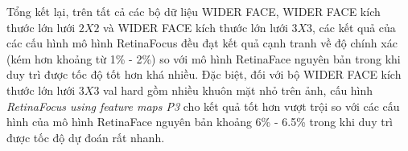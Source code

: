 {    \noindent
    Tổng kết lại, trên tất cả các bộ dữ liệu WIDER FACE, WIDER FACE kích thước lớn lưới $2 X 2$ và WIDER FACE kích thước lớn lưới $3 X 3$, các kết quả của các cấu hình mô hình RetinaFocus đều đạt kết quả cạnh tranh về độ chính xác (kém hơn khoảng từ 1\% - 2\%) so với mô hình RetinaFace nguyên bản trong khi duy trì được tốc độ tốt hơn khá nhiều.
    Đặc biệt, đối với bộ WIDER FACE kích thước lớn lưới $3 X 3$ val hard gồm nhiều khuôn mặt nhỏ trên ảnh, cấu hình \textit{RetinaFocus using feature maps P3} cho kết quả tốt hơn vượt trội so với các cấu hình của mô hình RetinaFace nguyên bản khoảng 6\% - 6.5\% trong khi duy trì được tốc độ dự đoán rất nhanh.
}